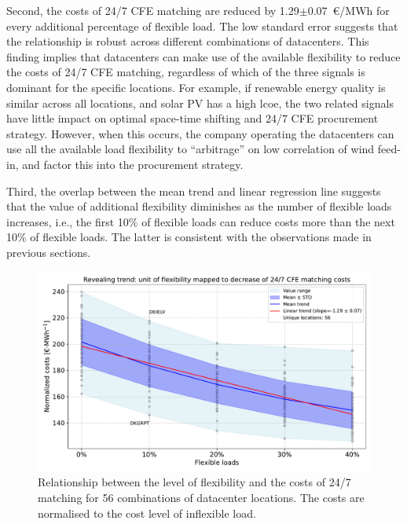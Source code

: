 Second, the costs of 24/7 CFE matching are reduced by 1.29$\pm$0.07~\euro/MWh for every additional percentage of flexible load. The low standard error suggests that the relationship is robust across different combinations of datacenters. This finding implies that datacenters can make use of the available flexibility to reduce the costs of 24/7 CFE matching, regardless of which of the three signals is dominant for the specific locations. For example, if renewable energy quality is similar across all locations, and solar PV has a high \gls{lcoe}, the two related signals have little impact on optimal space-time shifting and 24/7 CFE procurement strategy. However, when this occurs, the company operating the datacenters can use all the available load flexibility to \enquote{arbitrage} on low correlation of wind feed-in, and factor this into the procurement strategy.

Third, the overlap between the mean trend and linear regression line suggests that the value of additional flexibility diminishes as the number of flexible loads increases, i.e., the first 10\% of flexible loads can reduce costs more than the next 10\% of flexible loads. The latter is consistent with the observations made in previous sections.


\begin{figure}
    \centering
    \includegraphics[width=1\columnwidth]{img/flexibility_vs_normalized_costs.pdf}
    \caption{Relationship between the level of flexibility and the costs of 24/7 matching for 56 combinations of datacenter locations. The costs are normalised to the cost level of inflexible load.}
    \label{fig:flexcost}
\end{figure}

